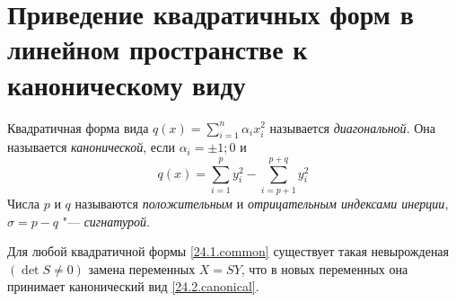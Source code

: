   \section{Приведение квадратичных форм в линейном пространстве к каноническому виду}
  \begin{defn}
  Квадратичная форма вида $q(x)=\sum\limits_{i=1}^n\alpha_ix_i^2$ называется \textit{диагональной}. Она называется \textit{канонической}, если $\alpha_i=\pm 1;0$ и 
  \begin{equation}\label{24.2.canonical}
  q(x)=\sum\limits_{i=1}^py_i^2-\sum\limits_{i=p+1}^{p+q}y_i^2
  \end{equation} 
  Числа $p$ и $q$ называются \textit{положительным} и \textit{отрицательным индексами инерции}, $\sigma=p-q$ "--- \textit{сигнатурой}.
  \end{defn}
  \begin{thm}
  Для любой квадратичной формы \eqref{24.1.common} существует такая невырожденая $(\det S \neq 0)$ замена переменных $X=SY$, что в новых переменных она принимает канонический вид \eqref{24.2.canonical}.
  \end{thm}
